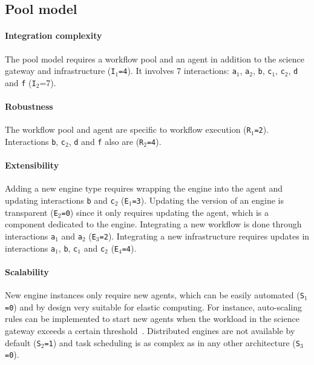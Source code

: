\documentclass[preprint,3p,twocolumn]{elsarticle}
\begin{document}
\subsection{Pool model}

\paragraph{Integration complexity} The pool model requires a workflow pool and an
agent in addition to the science gateway and infrastructure
(\texttt{I$_1$=4}). It involves 7 interactions: \texttt{a$_1$},
\texttt{a$_2$}, \texttt{b}, \texttt{c$_1$}, \texttt{c$_2$}, \texttt{d}
and \texttt{f} (\texttt{I$_2$}=7).

\paragraph{Robustness} The workflow pool and agent are specific to
workflow execution (\texttt{R$_1$=2}). Interactions \texttt{b},
\texttt{c$_2$}, \texttt{d} and \texttt{f} also are (\texttt{R$_2$=4}).

\paragraph{Extensibility} Adding a new engine type requires wrapping
the engine into the agent and updating interactions \texttt{b} and
\texttt{c$_2$} (\texttt{E$_1$=3}). Updating the version of an engine
is transparent (\texttt{E$_2$=0}) since it only requires updating the
agent, which is a component dedicated to the engine. Integrating a new workflow is
done through interactions \texttt{a$_1$} and \texttt{a$_2$}
(\texttt{E$_3$=2}). Integrating a new infrastructure requires updates
in interactions \texttt{a$_1$}, \texttt{b}, \texttt{c$_1$} and \texttt{c$_2$}
(\texttt{E$_4$=4}).

\paragraph{Scalability} New engine instances only require new agents,
which can be easily automated (\texttt{S$_1$=0}) and by design very
suitable for elastic computing. For instance, auto-scaling rules can
be implemented to start new agents when the workload in the science
gateway exceeds a certain threshold~\cite{lorido2012auto}. Distributed
engines are not available by default (\texttt{S$_2$=1}) and task
scheduling is as complex as in any other architecture
(\texttt{S$_3$=0}).
\end{document}
